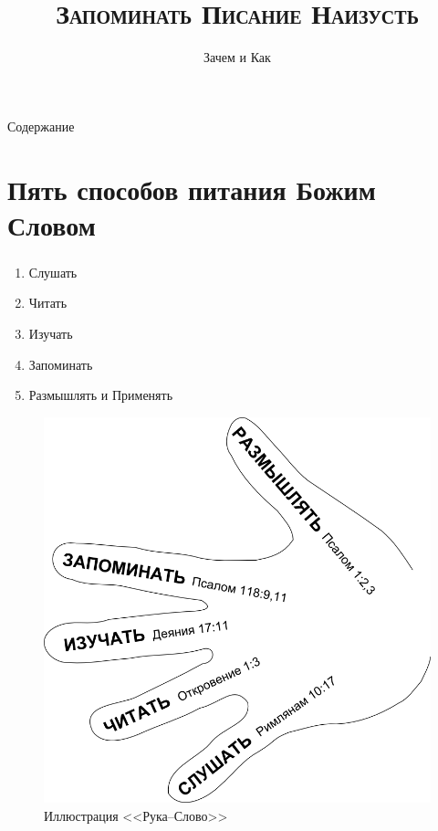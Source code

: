 \documentclass[t,aspectratio=169,14pt]{beamer}  %
\title{\textsc{\textbf{Запоминать Писание Наизусть}}}
\subtitle{Зачем и Как}
\author[Библейская Церковь СПб]{}
\date{}
\begin{document}
\frame[plain]{\titlepage}	%
\begin{frame}{Содержание}
    \tableofcontents[hideallsubsections]
\end{frame}
\section{Пять способов питания Божим Словом}
\begin{frame}
	\frametitle{\insertsection} 
	\framesubtitle{\insertsubsection}
	
	\begin{multicols}{2}
	\begin{enumerate}
		\item Слушать \pause
		\item Читать \pause
		\item Изучать \pause
		\item Запоминать \pause
		\item Размышлять и Применять
	\end{enumerate}
	\begin{figure}
		\includegraphics[height=0.6\textheight]{hand-word-ru-800}
		\caption{Иллюстрация <<Рука--Слово>>}
	\end{figure}	
	\end{multicols}
\end{frame}
\end{document}
